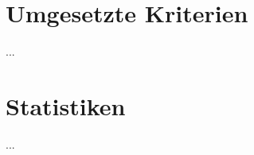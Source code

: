 \documentclass[../implementierung.tex]{subfiles}
\begin{document}
\section{Umgesetzte Kriterien}
...

\section{Statistiken}
...
\end{document}
